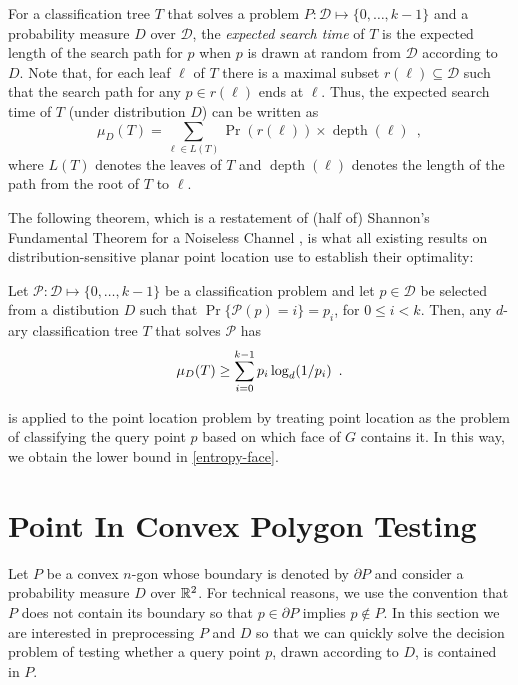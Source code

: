 \documentclass[charterfonts,lotsofwhite]{patmorin}
\newcommand{\boundary}{\partial}
\DeclareMathOperator{\depth}{depth}
\begin{document}
For a classification tree $T$ that solves a problem
$P:\mathcal{D}\mapsto\{0,\ldots,k-1\}$ and a probability measure $D$
over $\mathcal{D}$, the \emph{expected search time} of $T$ is the
expected length of the search path for $p$ when $p$ is drawn at random
from $\mathcal{D}$ according to $D$.  Note that, for each leaf $\ell$
of $T$ there is a maximal subset $r(\ell)\subseteq \mathcal{D}$ such
that the search path for any $p\in r(\ell)$ ends at $\ell$.  Thus, the
expected search time of $T$ (under distribution $D$) can be written as
\[
     \mu_D(T) = \sum_{\ell\in L(T)} \Pr(r(\ell))\times \depth(\ell)
	\enspace ,
\]
where $L(T)$ denotes the leaves of $T$ and $\depth(\ell)$ denotes the
length of the path from the root of $T$ to $\ell$.

The following theorem, which is a restatement of (half of) Shannon's
Fundamental Theorem for a Noiseless Channel \cite[Theorem 9]{s48}, is
what all existing results on distribution-sensitive planar point
location use to establish their optimality:

\setcounter{thm}{8}
\begin{thm}
Let $\mathcal{P}:\mathcal{D}\mapsto \{0,\ldots,k-1\}$ be a classification
problem and let $p\in \mathcal{D}$ be selected from a distibution $D$ such
that $\Pr\{\mathcal{P}(p)= i\}=p_i$, for $0\le i< k$.  Then, any
$d$-ary classification tree $T$ that solves $\mathcal{P}$ has
\begin{equation}
     \mu_D(T) \ge \sum_{i=0}^{k-1} p_i\log_d(1/p_i) \enspace .
	\eqlabel{shannon}
\end{equation}
\end{thm}
\setcounter{thm}{0}
 is applied to the point location problem by treating
point location as the problem of classifying the query point $p$ based
on which face of $G$ contains it.  In this way, we obtain the lower
bound in \eqref{entropy-face}.

\section{Point In Convex Polygon Testing}

Let $P$ be a convex $n$-gon whose boundary is denoted by $\partial P$
and consider a probability measure $D$ over $\mathbb{R}^2$.  For technical
reasons, we use the convention that $P$ does not contain its boundary
so that $p\in \boundary P$ implies $p\not\in P$.  In this section we
are interested in preprocessing $P$ and $D$ so that we can quickly
solve the decision problem of testing whether a query point $p$, drawn
according to $D$, is contained in $P$. 
\end{document}
